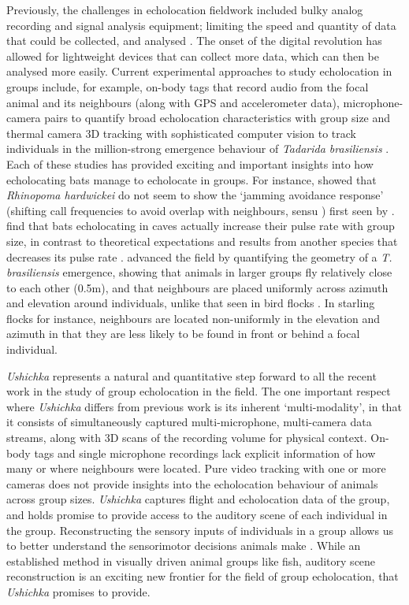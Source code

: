 \documentclass[
]{book}
\begin{document}
Previously, the challenges in echolocation fieldwork included bulky analog recording and signal analysis equipment; limiting the speed and quantity of data that could be collected, and analysed \citep{griffin1958a, habersetzer1981a}. The onset of the digital revolution has allowed for lightweight devices that can collect more data, which can then be analysed more easily. Current experimental approaches to study echolocation in groups include, for example, on-body tags that record audio from the focal animal and its neighbours (along with GPS and accelerometer data)\citep{cvikel2015b}, microphone-camera pairs to quantify broad echolocation characteristics with group size \citep{lin2016a} and thermal camera 3D tracking with sophisticated computer vision to track individuals in the million-strong emergence behaviour of \emph{Tadarida brasiliensis} \citep{betke2007tracking, theriault2010a}. Each of these studies has provided exciting and important insights into how echolocating bats manage to echolocate in groups. For instance, \citet{cvikel2015b} showed that \emph{Rhinopoma hardwickei} do not seem to show the `jamming avoidance response' (shifting call frequencies to avoid overlap with neighbours, sensu \citet{ulanovsky2004dynamics}) first seen by \citet{habersetzer1981a}. \citet{lin2016a} find that bats echolocating in caves actually increase their pulse rate with group size, in contrast to theoretical expectations and results from another species that decreases its pulse rate \citep{jarvis2013a}. \citet{theriault2010a} advanced the field by quantifying the geometry of a \emph{T. brasiliensis} emergence, showing that animals in larger groups fly relatively close to each other (0.5m), and that neighbours are placed uniformly across azimuth and elevation around individuals, unlike that seen in bird flocks \citep{ballerini2008a}. In starling flocks for instance, neighbours are located non-uniformly in the elevation and azimuth in that they are less likely to be found in front or behind a focal individual.

\emph{Ushichka} represents a natural and quantitative step forward to all the recent work in the study of group echolocation in the field. The one important respect where \emph{Ushichka} differs from previous work is its inherent `multi-modality', in that it consists of simultaneously captured multi-microphone, multi-camera data streams, along with 3D scans of the recording volume for physical context. On-body tags and single microphone recordings lack explicit information of how many or where neighbours were located. Pure video tracking with one or more cameras does not provide insights into the echolocation behaviour of animals across group sizes. \emph{Ushichka} captures flight and echolocation data of the group, and holds promise to provide access to the auditory scene \citep{Moss2001} of each individual in the group. Reconstructing the sensory inputs of individuals in a group allows us to better understand the sensorimotor decisions animals make \citep{strandburg2013visual}. While an established method in visually driven animal groups like fish, auditory scene reconstruction is an exciting new frontier for the field of group echolocation, that \emph{Ushichka} promises to provide.
\end{document}
